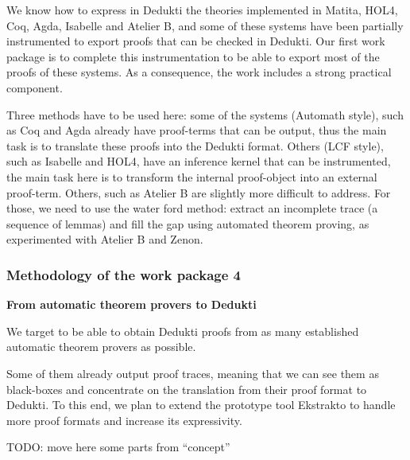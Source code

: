 We know how to express in Dedukti the theories implemented in Matita,
HOL4, Coq, Agda, Isabelle and Atelier B, and some of these systems
have been partially instrumented to export proofs that can be checked
in Dedukti. Our first work package is to complete this instrumentation
to be able to export most of the proofs of these systems. As a
consequence, the work includes a strong practical component.

Three methods have to be used here: some of the systems (Automath
style), such as Coq and Agda already have proof-terms that can be
output, thus the main task is to translate these proofs into the
Dedukti format. Others (LCF style), such as Isabelle and HOL4, have an
inference kernel that can be instrumented, the main task here is to
transform the internal proof-object into an external
proof-term. Others, such as Atelier B are slightly more difficult to
address. For those, we need to use the water ford method: extract an
incomplete trace (a sequence of lemmas) and fill the gap using
automated theorem proving, as experimented with Atelier B and Zenon.


\subsubsection{Methodology of the work package 4}

{\bf \large From automatic theorem provers to Dedukti}

We target to be able to obtain Dedukti proofs from as many established
automatic theorem provers as possible.

Some of them already output proof traces, meaning that we can see them
as black-boxes and concentrate on the translation from their proof format
to Dedukti. To this end, we plan to extend the prototype tool Ekstrakto
to handle more proof formats and increase its expressivity.

TODO: move here some parts from ``concept''


